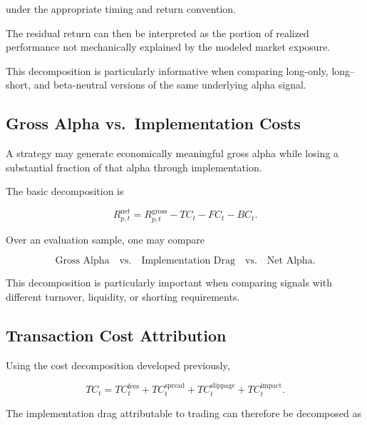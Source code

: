 \documentclass[11pt,a4paper]{article}
\begin{document}
under the appropriate timing and return convention.

The residual return can then be interpreted as the portion of realized
performance not mechanically explained by the modeled market exposure.

This decomposition is particularly informative when comparing long-only,
long--short, and beta-neutral versions of the same underlying alpha signal.


\subsection{Gross Alpha vs.\ Implementation Costs}

A strategy may generate economically meaningful gross alpha while losing a
substantial fraction of that alpha through implementation.

The basic decomposition is

\begin{equation}
\boxed{
R_{p,t}^{\mathrm{net}}
=
R_{p,t}^{\mathrm{gross}}
-
TC_t
-
FC_t
-
BC_t.
}
\end{equation}

Over an evaluation sample, one may compare

\begin{equation}
\boxed{
\text{Gross Alpha}
\quad\text{vs.}\quad
\text{Implementation Drag}
\quad\text{vs.}\quad
\text{Net Alpha}.
}
\end{equation}

This decomposition is particularly important when comparing signals with
different turnover, liquidity, or shorting requirements.


\subsection{Transaction Cost Attribution}

Using the cost decomposition developed previously,

\begin{equation}
TC_t
=
TC_t^{\mathrm{fees}}
+
TC_t^{\mathrm{spread}}
+
TC_t^{\mathrm{slippage}}
+
TC_t^{\mathrm{impact}}.
\end{equation}

The implementation drag attributable to trading can therefore be decomposed as
\end{document}
